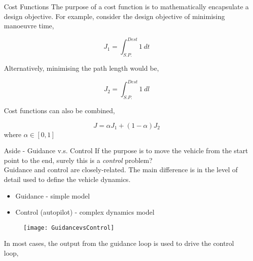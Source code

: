 \begin{frame}{Cost Functions}
	The purpose of a cost function is to mathematically encapsulate a design objective. For example, consider the design objective of minimising manoeuvre time,
	
	\begin{equation}
	J_1 = \int_{S.P.}^{Dest} 1\: dt
	\end{equation}
	
	Alternatively, minimising the path length would be,
	
	\begin{equation}
	J_2 = \int_{S.P.}^{Dest} 1\: dl
	\end{equation}
	
	Cost functions can also be combined,
	
	\begin{equation}
	J = \alpha J_1 + (1-\alpha) J_2
	\end{equation}
	where $\alpha \in [0,1]$
\end{frame}

\begin{frame}{Aside - Guidance v.s. Control}
	If the purpose is to move the vehicle from the start point to the end, surely this is a {\color{blue}\textit{control} }problem?\\
	Guidance and control are closely-related. The main difference is in the level of detail used to define the vehicle dynamics. 

	\begin{itemize}
		\item Guidance - simple model
		\item Control (autopilot) - complex dynamics model
	\end{itemize}

	\begin{figure}
		\vspace{-10pt}
		\centering
		\texttt{[image: GuidancevsControl]}
	\end{figure}
	
	\vspace{-50pt} In most cases, the output from the guidance loop is used to drive the control loop,
\end{frame}

